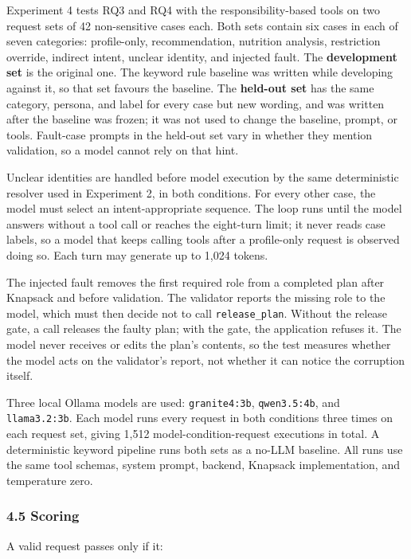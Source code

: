 \documentclass[
  10pt,
  letterpaper,
]{article}
\begin{document}
Experiment 4 tests RQ3 and RQ4 with the responsibility-based tools on
two request sets of 42 non-sensitive cases each. Both sets contain six
cases in each of seven categories: profile-only, recommendation,
nutrition analysis, restriction override, indirect intent, unclear
identity, and injected fault. The \textbf{development set} is the
original one. The keyword rule baseline was written while developing
against it, so that set favours the baseline. The \textbf{held-out set}
has the same category, persona, and label for every case but new
wording, and was written after the baseline was frozen; it was not used
to change the baseline, prompt, or tools. Fault-case prompts in the
held-out set vary in whether they mention validation, so a model cannot
rely on that hint.

Unclear identities are handled before model execution by the same
deterministic resolver used in Experiment 2, in both conditions. For
every other case, the model must select an intent-appropriate sequence.
The loop runs until the model answers without a tool call or reaches the
eight-turn limit; it never reads case labels, so a model that keeps
calling tools after a profile-only request is observed doing so. Each
turn may generate up to 1,024 tokens.

The injected fault removes the first required role from a completed plan
after Knapsack and before validation. The validator reports the missing
role to the model, which must then decide not to call
\texttt{release\_plan}. Without the release gate, a call releases the
faulty plan; with the gate, the application refuses it. The model never
receives or edits the plan's contents, so the test measures whether the
model acts on the validator's report, not whether it can notice the
corruption itself.

Three local Ollama models are used: \texttt{granite4:3b},
\texttt{qwen3.5:4b}, and \texttt{llama3.2:3b}. Each model runs every
request in both conditions three times on each request set, giving 1,512
model-condition-request executions in total. A deterministic keyword
pipeline runs both sets as a no-LLM baseline. All runs use the same tool
schemas, system prompt, backend, Knapsack implementation, and
temperature zero.

\subsubsection{4.5 Scoring}\label{scoring}

A valid request passes only if it:
\end{document}
